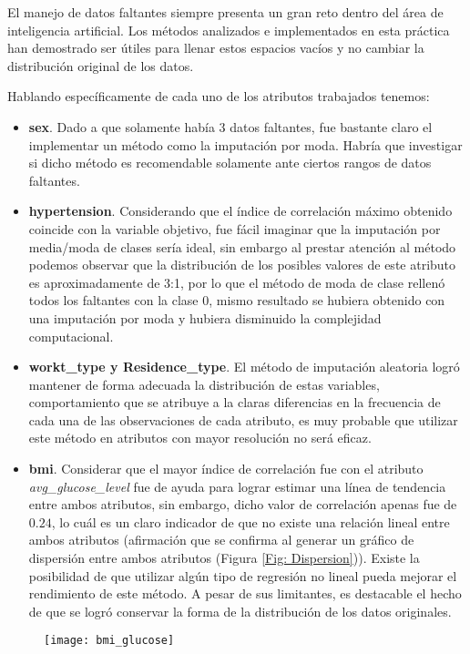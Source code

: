 El manejo de datos faltantes siempre presenta un gran reto dentro del área de inteligencia artificial. Los métodos analizados e implementados en esta práctica han demostrado ser útiles para llenar estos espacios vacíos y no cambiar la distribución original de los datos.

Hablando específicamente de cada uno de los atributos trabajados tenemos:

\begin{itemize}
	\item \textbf{sex}. Dado a que solamente había 3 datos faltantes, fue bastante claro el implementar un método como la imputación por moda. Habría que investigar si dicho método es recomendable solamente ante ciertos rangos de datos faltantes.
	
	\item \textbf{hypertension}. Considerando que el índice de correlación máximo obtenido coincide con la variable objetivo, fue fácil imaginar que la imputación por media/moda de clases sería ideal, sin embargo al prestar atención al método podemos observar que la distribución de los posibles valores de este atributo es aproximadamente de 3:1, por lo que el método de moda de clase rellenó todos los faltantes con la clase 0, mismo resultado se hubiera obtenido con una imputación por moda y hubiera disminuido la complejidad computacional.
	
	\item \textbf{workt\_type y Residence\_type}. El método de imputación aleatoria logró mantener de forma adecuada la distribución de estas variables, comportamiento que se atribuye a la claras diferencias en la frecuencia de cada una de las observaciones de cada atributo, es muy probable que utilizar este método en atributos con mayor resolución no será eficaz.
	
	\item \textbf{bmi}. Considerar que el mayor índice de correlación fue con el atributo \emph{avg\_glucose\_level} fue de ayuda para lograr estimar una línea de tendencia entre ambos atributos, sin embargo, dicho valor de correlación apenas fue de $0.24$, lo cuál es un claro indicador de que no existe una relación lineal entre ambos atributos (afirmación que se confirma al generar un gráfico de dispersión entre ambos atributos (Figura \ref{Fig: Dispersion})). Existe la posibilidad de que utilizar algún tipo de regresión no lineal pueda mejorar el rendimiento de este método. A pesar de sus limitantes, es destacable el hecho de que se logró conservar la forma de la distribución de los datos originales.
\end{itemize}

\begin{figure}[htbp]
	\centering
	\texttt{[image: bmi\_glucose]}
\end{figure}
